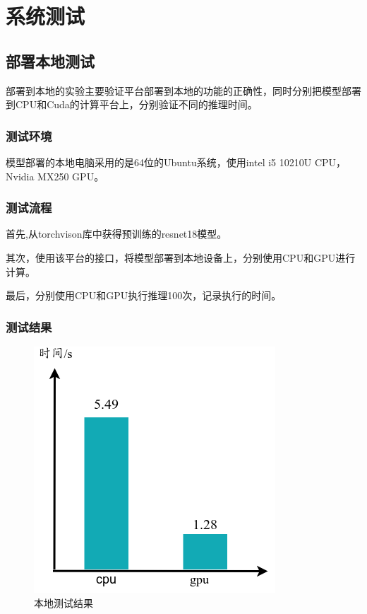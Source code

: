\chapter{系统测试}


\section{部署本地测试}

部署到本地的实验主要验证平台部署到本地的功能的正确性，同时分别把模型部署到CPU和Cuda的计算平台上，分别验证不同的推理时间。

\subsection{测试环境}

模型部署的本地电脑采用的是64位的Ubuntu系统，使用intel i5 10210U CPU，Nvidia MX250 GPU。


\subsection{测试流程}

首先,从torchvison库中获得预训练的resnet18模型。

其次，使用该平台的接口，将模型部署到本地设备上，分别使用CPU和GPU进行计算。

最后，分别使用CPU和GPU执行推理100次，记录执行的时间。

\subsection{测试结果}

\begin{figure}[h!]
    \centering
    \includegraphics[width=180bp]{figure/expr_local.png}
    \caption{本地测试结果}
    \label{expr_local}
\end{figure}

